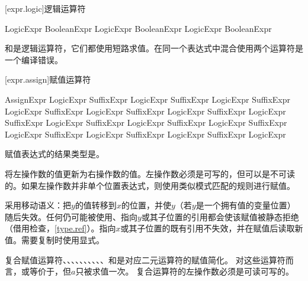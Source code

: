 [expr.logic]{逻辑运算符}

\begin{bnf}{LogicExpr}
    BooleanExpr \br
    LogicExpr \terminal{\&\&} BooleanExpr \br
    LogicExpr \terminal{||} BooleanExpr
\end{bnf}

\pnum
\tcode{\&\&}和\tcode{||}是逻辑运算符，它们都使用短路求值。在同一个表达式中混合使用两个运算符是一个编译错误。

[expr.assign]{赋值运算符}

\begin{bnf}{AssignExpr}
    LogicExpr \br
    SuffixExpr \terminal{=} LogicExpr \br
    SuffixExpr \terminal{+=} LogicExpr \br
    SuffixExpr \terminal{-=} LogicExpr \br
    SuffixExpr \terminal{*=} LogicExpr \br
    SuffixExpr \terminal{/=} LogicExpr \br
    SuffixExpr \terminal{\%=} LogicExpr \br
    SuffixExpr  LogicExpr \br
    SuffixExpr  LogicExpr \br
    SuffixExpr  LogicExpr \br
    SuffixExpr  LogicExpr \br
    SuffixExpr  LogicExpr \br
    SuffixExpr  LogicExpr \br
    SuffixExpr \terminal{\~=} LogicExpr
\end{bnf}

\pnum
赋值表达式的结果类型是。

\pnum
\tcode{=}将左操作数的值更新为右操作数的值。左操作数必须是可写的，但可以是不可读的。如果左操作数并非单个位置表达式，则使用类似模式匹配的规则进行赋值。

\pnum
\tcode{=}采用移动语义：把$y$的值转移到$x$的位置，并使$y$（若$y$是一个拥有值的变量位置）随后失效。任何仍可能被使用、指向$y$或其子位置的引用都会使该赋值被静态拒绝（借用检查，\ref{type.ref}）。指向$x$或其子位置的既有引用不失效，并在赋值后读取新值。需要复制时使用显式。

\pnum
复合赋值运算符\tcode{+=}、\tcode{-=}、\tcode{*=}、\tcode{/=}、\tcode{\%=}、、、、、、\tcode{\~=}和是对应二元运算符的赋值简化。
对这些运算符而言，或等价于，但$a$只被求值一次。
复合运算符的左操作数必须是可读可写的。
